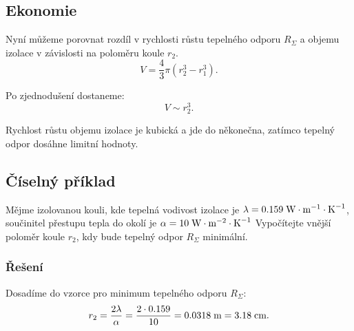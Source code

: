 \documentclass{article}
\begin{document}
\subsection{Ekonomie}

Nyní můžeme porovnat rozdíl v rychlosti růstu tepelného odporu $R_\Sigma$ a objemu izolace v závislosti na poloměru koule $r_2$.
$$
    V = \frac{4}{3} \pi (r_2^3 - r_1^3).
$$

Po zjednodušení dostaneme:
$$
    V \sim r_2^3.
$$

Rychlost růstu objemu izolace je kubická a jde do někonečna, zatímco tepelný odpor dosáhne limitní hodnoty.


\subsection{Číselný příklad}
Mějme izolovanou kouli, kde tepelná vodivost izolace je $\lambda = 0.159 \; \textrm{W} \cdot \textrm{m}^{-1} \cdot \textrm{K}^{-1}$, součinitel přestupu tepla do okolí je $\alpha = 10 \; \textrm{W} \cdot \textrm{m}^{-2} \cdot \textrm{K}^{-1}$ Vypočítejte vnější poloměr koule $r_2$, kdy bude tepelný odpor $R_\Sigma$ minimální.

\subsubsection{Řešení}
Dosadíme do vzorce pro minimum tepelného odporu $R_\Sigma$:
$$
    r_2 = \frac{2 \lambda}{\alpha} = \frac{2 \cdot 0.159}{10} = 0.0318 \; \textrm{m} = 3.18 \; \textrm{cm}.
$$
\end{document}
